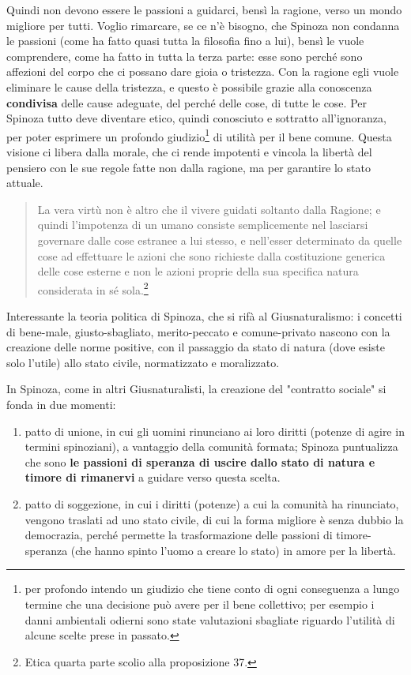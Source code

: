 Quindi non devono essere le passioni a guidarci, bensì la ragione, verso un mondo migliore per tutti. Voglio rimarcare, se ce n'è bisogno, che Spinoza non condanna le passioni (come ha fatto quasi tutta la filosofia fino a lui), bensì le vuole comprendere, come ha fatto in tutta la terza parte: esse sono  perché sono affezioni del corpo che ci possano dare gioia o tristezza. Con la ragione egli vuole eliminare le cause della tristezza, e questo è possibile grazie alla conoscenza \textbf{condivisa} delle cause adeguate, del perché delle cose, di tutte le cose. Per Spinoza tutto deve diventare etico, quindi conosciuto e sottratto all'ignoranza, per poter esprimere un profondo giudizio\footnote{per profondo intendo un giudizio che tiene conto di ogni conseguenza a lungo termine che una decisione può avere per il bene collettivo; per esempio i danni ambientali odierni sono state valutazioni sbagliate riguardo l'utilità di alcune scelte prese in passato.} di utilità per il bene comune. Questa visione ci libera dalla morale, che  ci rende impotenti e vincola la libertà del pensiero con le sue regole fatte non dalla ragione, ma per garantire lo stato attuale.

\begin{quotation}
	\small La vera virtù non è altro che il vivere guidati soltanto dalla Ragione; e quindi l’impotenza di
	un umano consiste semplicemente nel lasciarsi governare dalle cose estranee a lui stesso, e
	nell’esser determinato da quelle cose ad effettuare le azioni che sono richieste dalla costituzione generica delle cose esterne e non le azioni proprie della sua specifica natura considerata in sé sola.\footnote{Etica quarta parte scolio alla proposizione 37.}
\end{quotation}

Interessante la teoria politica di Spinoza, che si rifà al Giusnaturalismo: i concetti di bene-male, giusto-sbagliato, merito-peccato e comune-privato nascono con la creazione delle norme positive, con il passaggio da stato di natura (dove esiste solo l'utile) allo stato civile, normatizzato e moralizzato.

In Spinoza, come in altri Giusnaturalisti, la creazione del "contratto sociale" si fonda in due momenti:
\begin{enumerate}
	\item patto di unione, in cui gli uomini rinunciano ai loro diritti (potenze di agire in termini spinoziani), a vantaggio della comunità formata; Spinoza puntualizza che sono \textbf{le passioni di speranza di uscire dallo stato di natura e timore di rimanervi} a guidare verso questa scelta.
	\item patto di soggezione, in cui i diritti (potenze) a cui la comunità ha rinunciato, vengono traslati ad uno stato civile, di cui la forma migliore è senza dubbio la democrazia, perché permette la trasformazione delle passioni di timore-speranza (che hanno spinto l'uomo a creare lo stato) in amore per la libertà.
\end{enumerate}

